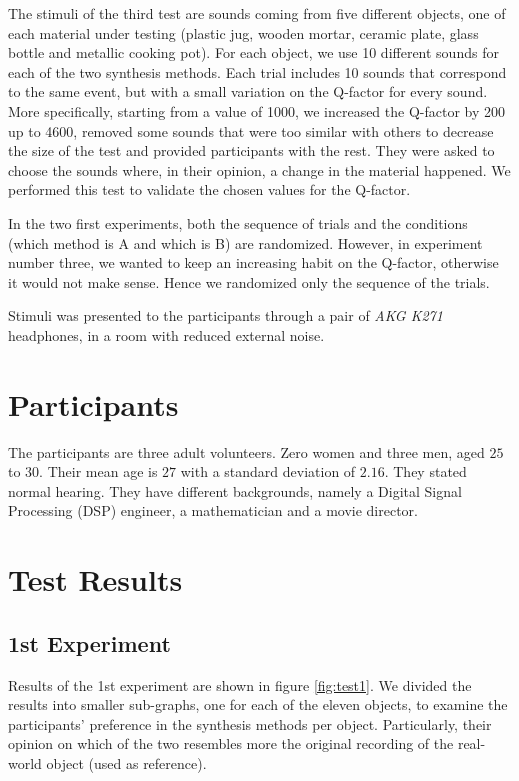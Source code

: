 The stimuli of the third test are sounds coming from five different objects, one of each material under testing (plastic jug, wooden mortar, ceramic plate, glass bottle and metallic cooking pot). For each object, we use 10 different sounds for each of the two synthesis methods. Each trial includes 10 sounds that correspond to the same event, but with a small variation on the Q-factor for every sound. More specifically, starting from a value of 1000, we increased the Q-factor by 200 up to 4600, removed some sounds that were too similar with others to decrease the size of the test and provided participants with the rest. They were asked to choose the sounds where, in their opinion, a change in the material happened. We performed this test to validate the chosen values for the Q-factor.

In the two first experiments, both the sequence of trials and the conditions (which method is A and which is B) are randomized. However, in experiment number three, we wanted to keep an increasing habit on the Q-factor, otherwise it would not make sense. Hence we randomized only the sequence of the trials.

Stimuli was presented to the participants through a pair of \textit{AKG K271} headphones, in a room with reduced external noise.

\section{Participants}
The participants are three adult volunteers. Zero women and three men, aged $25$ to $30$. Their mean age is $27$ with a standard deviation of $2.16$. They stated normal hearing. They have different backgrounds, namely a Digital Signal Processing (DSP) engineer, a mathematician and a movie director.

\section{Test Results}

\subsection{1st Experiment}
Results of the 1st experiment are shown in figure \ref{fig:test1}. We divided the results into smaller sub-graphs, one for each of the eleven objects, to examine the participants' preference in the synthesis methods per object. Particularly, their opinion on which of the two resembles more the original recording of the real-world object (used as reference).

